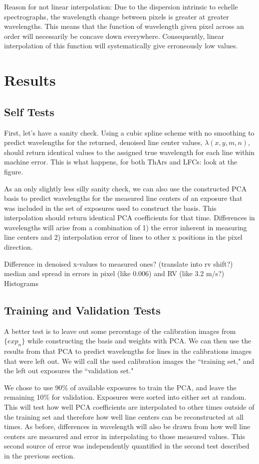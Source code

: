 \documentclass[12pt, letterpaper]{article}
\begin{document}
Reason for not linear interpolation:
Due to the dispersion intrinsic to echelle spectrographs, the wavelength change between pixels is greater at greater wavelengths.  This means that the function of wavelength given pixel across an order will necessarily be concave down everywhere.  Consequently, linear interpolation of this function will systematically give erroneously low values.


\section{Results} \label{sec:results}
\subsection{Self Tests} \label{sec:test-self}
First, let's have a sanity check.  Using a cubic spline scheme with no smoothing to predict wavelengths for the returned, denoised line center values, $\lambda(x,y,m,n)$, should return identical values to the assigned true wavelength for each line within machine error.
This is what happens, for both ThArs and LFCs: look at the figure.

As an only slightly less silly sanity check, we can also use the constructed PCA basis to predict wavelengths for the measured line centers of an exposure that was included in the set of exposures used to construct the basis.  This interpolation should return identical PCA coefficients for that time.  Differences in wavelengths will arise from a combination of 1) the error inherent in measuring line centers and 2) interpolation error of lines to other x positions in the pixel direction.

Difference in denoised x-values to measured ones? (translate into rv shift?)
median and spread in errors in pixel (like 0.006) and RV (like 3.2 m/s?)
Histograms

\subsection{Training and Validation Tests} \label{sec:test-trainNvalid}
A better test is to leave out some percentage of the calibration images from $\{exp_n\}$ while constructing the basis and weights with PCA.  We can then use the results from that PCA to predict wavelengths for lines in the calibrations images that were left out.  We will call the used calibration images the ``training set," and the left out exposures the ``validation set."

We chose to use 90\% of available exposures to train the PCA, and leave the remaining 10\% for validation.  Exposures were sorted into either set at random.  This will test how well PCA coefficients are interpolated to other times outside of the training set and therefore how well line centers can be reconstructed at all times.  As before, differences in wavelength will also be drawn from how well line centers are measured and error in interpolating to those measured values.  This second source of error was independently quantified in the second test described in the previous section.
\end{document}
